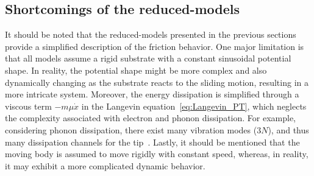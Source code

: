 \subsection{Shortcomings of the reduced-models}
It should be noted that the reduced-models presented in the previous sections provide a simplified description of the friction behavior. One major limitation is that all models assume a rigid substrate with a constant sinusoidal potential shape. In reality, the potential shape might be more complex and also dynamically changing as the substrate reacts to the sliding motion, resulting in a more intricate system. Moreover, the energy dissipation is simplified through a viscous term $-m\mu \dot{x}$ in the Langevin equation~\cref{eq:Langevin_PT}, which neglects the complexity associated with electron and phonon dissipation. For example, considering phonon dissipation, there exist many vibration modes ($3N$), and thus many dissipation channels for the tip~\cite{Yalin_2011}. Lastly, it should be mentioned that the moving body is assumed to move rigidly with constant speed, whereas, in reality, it may exhibit a more complicated dynamic behavior.







